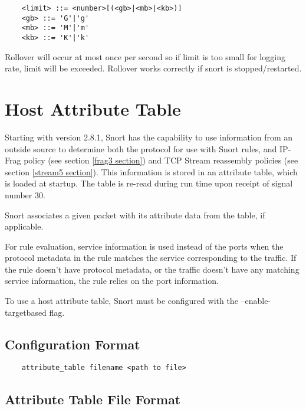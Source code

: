 \documentclass[english]{report}
\newenvironment{note}{
\samepage
    \vspace{10pt}{\textsf{
        {\hspace{7pt}\Huge{$\triangle$\hspace{-12.5pt}{\Large{$^!$}}}}\hspace{5pt}
        {\Large{NOTE}}
    }
    }
   \begin{center}
    \par\vspace{-17pt}

    \begin{lrbox}{\savepar}
    \begin{minipage}[r]{6in}
}
{
    \end{minipage}
    \end{lrbox}
    \fbox{
        \usebox{
            \savepar
	}
    }
    \par\vskip10pt
    \end{center}
}
\newenvironment{note}{
        \begin{rawhtml}
        <p><table border="1"><tr><td><b>
        Note:&nbsp;&nbsp;</b>
        \end{rawhtml}
}{
        \begin{rawhtml}
        </b></td></tr></table></p>
        \end{rawhtml}
}
\begin{document}
\begin{verbatim}
    <limit> ::= <number>[(<gb>|<mb>|<kb>)]
    <gb> ::= 'G'|'g'
    <mb> ::= 'M'|'m'
    <kb> ::= 'K'|'k'
\end{verbatim}

Rollover will occur at most once per second so if limit is too small for
logging rate, limit will be exceeded.  Rollover works correctly if snort is
stopped/restarted.

\section{Host Attribute Table}
\label{targetbased}

Starting with version 2.8.1, Snort has the capability to use information from
an outside source to determine both the protocol for use with Snort rules, and
IP-Frag policy (see section \ref{frag3 section}) and TCP Stream reassembly
policies (see section \ref{stream5 section}).  This information is stored in an
attribute table, which is loaded at startup.  The table is re-read during run
time upon receipt of signal number 30.

Snort associates a given packet with its attribute data from the table, if
applicable.

For rule evaluation, service information is used instead of the ports when the
protocol metadata in the rule matches the service corresponding to the traffic.
If the rule doesn't have protocol metadata, or the traffic doesn't have any
matching service information, the rule relies on the port information.

\begin{note}

To use a host attribute table, Snort must be configured with the
--enable-targetbased flag.

\end{note}

\subsection{Configuration Format}

\begin{verbatim}
    attribute_table filename <path to file>
\end{verbatim}

\subsection{Attribute Table File Format}
\end{document}
